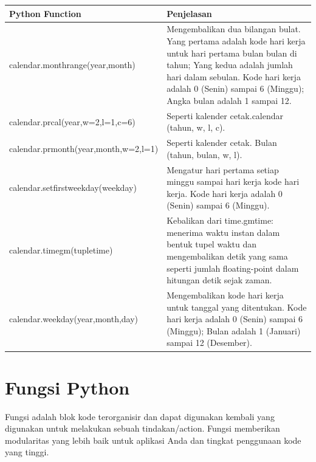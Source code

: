 \begin{center}
\begin{tabular}{ | m{6cm} | m{4cm} | }
\hline
Python Function & Penjelasan \\
\hline
calendar.monthrange(year,month) & Mengembalikan dua bilangan bulat. Yang pertama adalah kode hari kerja untuk hari pertama bulan bulan di tahun; Yang kedua adalah jumlah hari dalam sebulan. Kode hari kerja adalah 0 (Senin) sampai 6 (Minggu); Angka bulan adalah 1 sampai 12. \\
\hline
calendar.prcal(year,w=2,l=1,c=6) & Seperti kalender cetak.calendar (tahun, w, l, c). \\
\hline
calendar.prmonth(year,month,w=2,l=1) & Seperti kalender cetak. Bulan (tahun, bulan, w, l). \\
\hline
calendar.setfirstweekday(weekday) & Mengatur hari pertama setiap minggu sampai hari kerja kode hari kerja. Kode hari kerja adalah 0 (Senin) sampai 6 (Minggu). \\
\hline
calendar.timegm(tupletime) & Kebalikan dari time.gmtime: menerima waktu instan dalam bentuk tupel waktu dan mengembalikan detik yang sama seperti jumlah floating-point dalam hitungan detik sejak zaman. \\
\hline
calendar.weekday(year,month,day) & Mengembalikan kode hari kerja untuk tanggal yang ditentukan. Kode hari kerja adalah 0 (Senin) sampai 6 (Minggu); Bulan adalah 1 (Januari) sampai 12 (Desember). \\
\hline
\end{tabular}
\end{center}

\section{Fungsi Python}
Fungsi adalah blok kode terorganisir dan dapat digunakan kembali yang digunakan untuk melakukan sebuah tindakan/action. Fungsi memberikan modularitas yang lebih baik untuk aplikasi Anda dan tingkat penggunaan kode yang tinggi.

